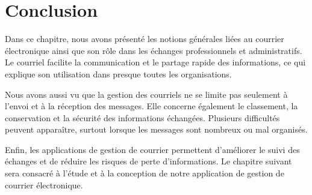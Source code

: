 \section{Conclusion}
\label{sec:conclusion_generalites_courrier}

Dans ce chapitre, nous avons présenté les notions générales liées au courrier électronique ainsi que son rôle dans les échanges professionnels et administratifs. Le courriel facilite la communication et le partage rapide des informations, ce qui explique son utilisation dans presque toutes les organisations.

Nous avons aussi vu que la gestion des courriels ne se limite pas seulement à l’envoi et à la réception des messages. Elle concerne également le classement, la conservation et la sécurité des informations échangées. Plusieurs difficultés peuvent apparaître, surtout lorsque les messages sont nombreux ou mal organisés.

Enfin, les applications de gestion de courrier permettent d’améliorer le suivi des échanges et de réduire les risques de perte d’informations. Le chapitre suivant sera consacré à l’étude et à la conception de notre application de gestion de courrier électronique.
